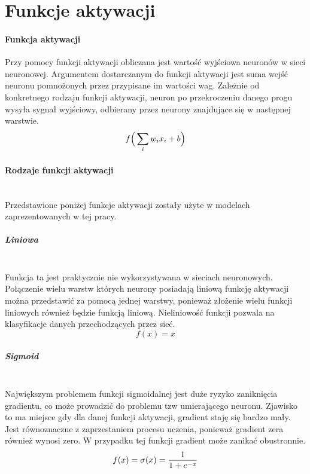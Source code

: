 \section{Funkcje aktywacji}

\paragraph{Funkcja aktywacji}
Przy pomocy funkcji aktywacji obliczana jest wartość wyjściowa neuronów w sieci
neuronowej. Argumentem dostarczanym do funkcji aktywacji jest suma wejść neuronu
pomnożonych przez przypisane im wartości wag. Zależnie od konkretnego rodzaju funkcji
aktywacji, neuron po przekroczeniu danego progu wysyła sygnał wyjściowy, odbierany
przez neurony znajdujące się w następnej warstwie.
\begin{equation}
f\Big(\sum_{i}w_{i}x_{i} + b\Big) \\
\end{equation}

\paragraph{Rodzaje funkcji aktywacji} \mbox{}\\
Przedstawione poniżej funkcje aktywacji zostały użyte w modelach zaprezentowanych
w tej pracy.

\subparagraph{Liniowa} \mbox{}\\
Funkcja ta jest praktycznie nie wykorzystywana w sieciach neuronowych. Połączenie
wielu warstw których neurony posiadają liniową funkcję aktywacji można przedstawić
za pomocą jednej warstwy,  ponieważ złożenie wielu funkcji liniowych również będzie
funkcją liniową. Nieliniowość funkcji pozwala na klasyfikacje danych przechodzących
przez sieć.
\begin{equation}
f(x) = x
\end{equation}


\subparagraph{Sigmoid} \mbox{}\\
Największym problemem funkcji sigmoidalnej jest duże ryzyko zaniknięcia gradientu,
co może prowadzić do problemu tzw umierającego neuronu. Zjawisko to ma miejsce
gdy dla danej funkcji aktywacji, gradient staję się bardzo mały. Jest równoznaczne
z zaprzestaniem procesu uczenia, ponieważ gradient zera również wynosi zero.
W przypadku tej funkcji gradient może zanikać obustronnie.
\begin{equation}
f(x) = \sigma(x) = \frac{1}{1 + e^{-x}} \\
\end{equation}

